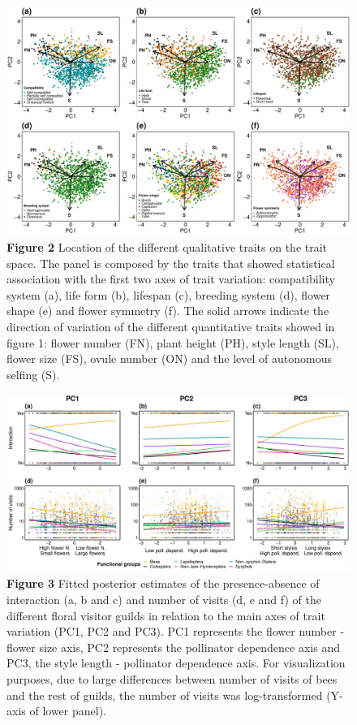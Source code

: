 \documentclass[
  12pt,
  a4paper,
]{article}
\newcommand{\blandscape}{\begin{landscape}}
\newcommand{\elandscape}{\end{landscape}}
\begin{document}
\blandscape

\begin{figure}[H]

{\centering \includegraphics[width=0.8\linewidth]{output/figures/unnamed-chunk-3-1} 

}

\caption{\textbf{Figure 2} Location of the different qualitative traits on the trait space. The panel is composed by the traits that showed statistical association with the first two axes of trait variation: compatibility system (a), life form (b), lifespan (c), breeding system (d), flower shape (e) and flower symmetry (f). The solid arrows indicate the direction of variation of the different quantitative traits showed in figure 1: flower number (FN), plant height (PH), style length (SL), flower size (FS), ovule number (ON) and the level of autonomous selfing (S).}\label{fig:unnamed-chunk-3}
\end{figure}

\elandscape

\vspace{5mm}
\blandscape

\begin{figure}
\centering
\includegraphics{output/figures/unnamed-chunk-4-1.pdf}
\caption{\label{fig:unnamed-chunk-4}\textbf{Figure 3} Fitted posterior estimates of the presence-absence of interaction (a, b and c) and number of visits (d, e and f) of the different floral visitor guilds in relation to the main axes of trait variation (PC1, PC2 and PC3). PC1 represents the flower number - flower size axis, PC2 represents the pollinator dependence axis and PC3, the style length - pollinator dependence axis. For visualization purposes, due to large differences between number of visits of bees and the rest of guilds, the number of visits was log-transformed (Y-axis of lower panel).}
\end{figure}

\elandscape
\end{document}
